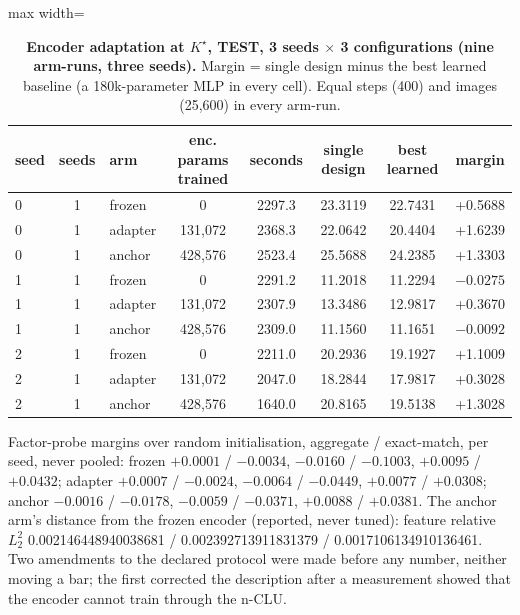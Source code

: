 \documentclass{article} %
\newcommand{\Kstar}{\ensuremath{K^{\star}}}
\begin{document}
\begin{table}[h]
\centering\small
\caption{\textbf{Encoder adaptation at $\Kstar$, TEST, 3 seeds $\times$ 3 configurations (nine
arm-runs, three seeds).} Margin = single design minus the best learned baseline (a 180k-parameter %
MLP in every cell). Equal steps (400) and images (25,600) in every arm-run.} %
\label{tab:adapt}
\setlength{\tabcolsep}{3pt}
\begin{adjustbox}{max width=\linewidth}\begin{tabular}{lclccccc}
\toprule
seed & seeds & arm & enc. params trained & seconds & single design & best learned & margin \\
\midrule
0 & 1 & frozen & 0 & 2297.3 & 23.3119 & 22.7431 & +0.5688 \\
0 & 1 & adapter & 131,072 & 2368.3 & 22.0642 & 20.4404 & +1.6239 \\
0 & 1 & anchor & 428,576 & 2523.4 & 25.5688 & 24.2385 & +1.3303 \\
1 & 1 & frozen & 0 & 2291.2 & 11.2018 & 11.2294 & $-0.0275$ \\
1 & 1 & adapter & 131,072 & 2307.9 & 13.3486 & 12.9817 & +0.3670 \\
1 & 1 & anchor & 428,576 & 2309.0 & 11.1560 & 11.1651 & $-0.0092$ \\
2 & 1 & frozen & 0 & 2211.0 & 20.2936 & 19.1927 & +1.1009 \\
2 & 1 & adapter & 131,072 & 2047.0 & 18.2844 & 17.9817 & +0.3028 \\
2 & 1 & anchor & 428,576 & 1640.0 & 20.8165 & 19.5138 & +1.3028 \\
\bottomrule
\end{tabular}\end{adjustbox}
\end{table}

\noindent Factor-probe margins over random initialisation, aggregate / exact-match, per seed, never
pooled: frozen $+0.0001$ / $-0.0034$, $-0.0160$ / $-0.1003$, $+0.0095$ / $+0.0432$; adapter
$+0.0007$ / $-0.0024$, $-0.0064$ / $-0.0449$, $+0.0077$ / $+0.0308$; anchor $-0.0016$ / $-0.0178$,
$-0.0059$ / $-0.0371$, $+0.0088$ / $+0.0381$. The anchor arm's distance from the frozen encoder
(reported, never tuned): feature relative $L_2^2$ 0.002146448940038681 / 0.002392713911831379 /
0.0017106134910136461. %
Two amendments to the declared protocol were made before any number, neither moving a bar; the first
corrected the description after a measurement showed that the encoder cannot train through the
n-CLU. %
\end{document}
